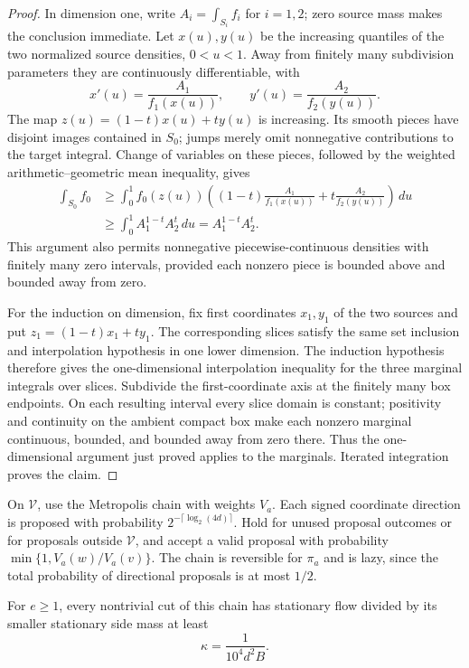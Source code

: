 \begin{proof}
In dimension one, write $A_i=\int_{S_i}f_i$ for $i=1,2$; zero source
mass makes the conclusion immediate.  Let $x(u),y(u)$ be the increasing
quantiles of the two normalized source densities, $0<u<1$.  Away from
finitely many subdivision parameters they are continuously
differentiable, with
\[
 x'(u)=\frac{A_1}{f_1(x(u))},
 \qquad y'(u)=\frac{A_2}{f_2(y(u))}.
\]
The map $z(u)=(1-t)x(u)+ty(u)$ is increasing.  Its smooth pieces have
disjoint images contained in $S_0$; jumps merely omit nonnegative
contributions to the target integral.  Change of variables on these
pieces, followed by the weighted arithmetic--geometric mean inequality,
gives
\begin{align*}
 \int_{S_0}f_0
 &\ge\int_0^1 f_0(z(u))
 \left((1-t)\frac{A_1}{f_1(x(u))}
             +t\frac{A_2}{f_2(y(u))}\right)\,du\\
 &\ge\int_0^1 A_1^{1-t}A_2^t\,du
  =A_1^{1-t}A_2^t.
\end{align*}
This argument also permits nonnegative piecewise-continuous densities
with finitely many zero intervals, provided each nonzero piece is
bounded above and bounded away from zero.

For the induction on dimension, fix first coordinates $x_1,y_1$ of
the two sources and put $z_1=(1-t)x_1+ty_1$.  The corresponding slices
satisfy the same set inclusion and interpolation hypothesis in one
lower dimension.  The induction hypothesis therefore gives the
one-dimensional interpolation inequality for the three marginal
integrals over slices.  Subdivide the first-coordinate axis at the
finitely many box endpoints.  On each resulting interval every slice
domain is constant; positivity and continuity on the ambient compact
box make each nonzero marginal continuous, bounded, and bounded away
from zero there.  Thus the one-dimensional argument just proved applies
to the marginals.  Iterated integration proves the claim.
\end{proof}

On $\mathcal V$, use the Metropolis chain with weights $V_a$.  Each
signed coordinate direction is proposed with probability
$2^{-\lceil\log_2(4d)\rceil}$.  Hold for unused proposal outcomes or
for proposals outside $\mathcal V$, and accept a valid proposal with
probability $\min\{1,V_a(w)/V_a(v)\}$.  The chain is reversible for
$\pi_a$ and is lazy, since the total probability
of directional proposals is at most $1/2$.

\begin{lemma}
\label{lem:bin-conductance}
For $e\ge1$, every nontrivial cut of this chain has stationary flow
divided by its smaller stationary side mass at least
\[
 \kappa=\frac{1}{10^4d^2B}.
\]
\end{lemma}

